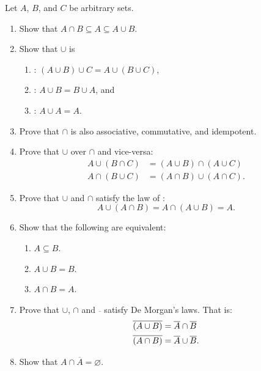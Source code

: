 \begin{Exercise}
Let $A$, $B$, and $C$ be arbitrary sets.
\begin{enumerate}
\item Show that $A \cap B \subseteq A \subseteq A \cup B$.

\item Show that $\cup$ is
\begin{enumerate}[label=(\roman*)]
\item {}: $(A \cup B) \cup C = A \cup (B \cup C)$,
\item {}: $A \cup B = B \cup A$, and
\item {}: $A \cup A = A$.
\end{enumerate}

\item Prove that $\cap$ is also associative, commutative, and idempotent.

\item Prove that $\cup$  over $\cap$ and vice-versa:
\begin{align*}
A \cup (B \cap C) & = (A \cup B) \cap (A \cup C) \\
A \cap (B \cup C) & = (A \cap B) \cup (A \cap C).
\end{align*}

\item Prove that $\cup$ and $\cap$ satisfy the law of :
\begin{equation*}
A \cup (A \cap B) = A \cap (A \cup B) = A.
\end{equation*}

\item Show that the following are equivalent:
\begin{enumerate}
\item $A \subseteq B$.
\item $A \cup B = B$.
\item $A \cap B = A$.
\end{enumerate}

\item Prove that $\cup$, $\cap$ and $\overline{~}$ satisfy De Morgan's laws. That is:
\begin{align*}
\overline {\pqty{A \cup B}} & = \overline A \cap \overline B \\
\overline {\pqty{A \cap B}} & = \overline A \cup \overline B.
\end{align*}

\item Show that $A \cap \overline A = \varnothing$.
\end{enumerate}

\end{Exercise}

